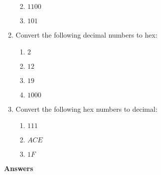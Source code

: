 \documentclass{article}
\begin{document}
\begin{enumerate}
\begin{enumerate}
\vfill

\item $1100$

\vfill

\item $101$

\vfill
\end{enumerate}

\newpage

\item Convert the following decimal numbers to hex:
\begin{enumerate}
\item $2$

\vfill

\item $12$

\vfill

\item $19$

\vfill

\item $1000$

\vfill

\end{enumerate}

\item Convert the following hex numbers to decimal:
\begin{enumerate}
\item $111$

\vfill

\item $ACE$

\vfill

\item $1F$

\vfill
\end{enumerate}

\end{enumerate}

\newpage

\noindent\textbf{Answers}

\vspace{0.2in}
\end{document}
